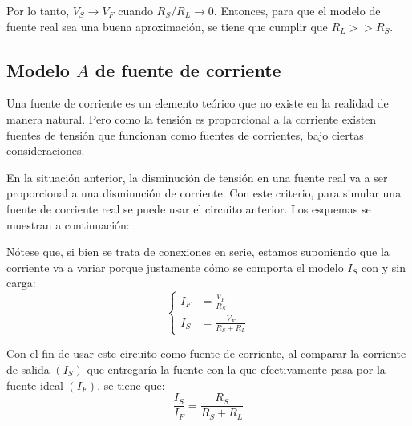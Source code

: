 \documentclass[a5paper,12pt,twoside]{book}
\begin{document}
Por lo tanto, $V_S \to V_F$ cuando $R_S / R_L \to 0$. Entonces, para que el modelo de fuente real sea una buena aproximación, se tiene que cumplir que $R_L >> R_S$.

\begin{center}
    \def\svgwidth{0.6\linewidth}
    
\end{center}


\subsection*{Modelo $A$ de fuente de corriente}

Una fuente de corriente es un elemento teórico que no existe en la realidad de manera natural. Pero como la tensión es proporcional a la corriente existen fuentes de tensión que funcionan como fuentes de corrientes, bajo ciertas consideraciones.

En la situación anterior, la disminución de tensión en una fuente real va a ser proporcional a una disminución de corriente.
Con este criterio, para simular una fuente de corriente real se puede usar el circuito anterior.
Los esquemas se muestran a continuación:

\begin{multicols}{2}
    \begin{center}
        \def\svgwidth{0.9\linewidth}
        
    \end{center}
    \begin{center}
        \def\svgwidth{0.9\linewidth}
        
    \end{center}
\end{multicols}

Nótese que, si bien se trata de conexiones en serie, estamos suponiendo que la corriente va a variar porque justamente cómo se comporta el modelo $I_S$ con y sin carga:
\begin{equation*}
    \left\{
    \begin{aligned}
        I_F &= \frac{V_F}{R_S}
        \\[1ex]
        I_S &= \frac{V_F}{R_S + R_L}
    \end{aligned}
    \right.
\end{equation*}

Con el fin de usar este circuito como fuente de corriente, al comparar la corriente de salida $(I_S)$ que entregaría la fuente con la que efectivamente pasa por la fuente ideal $(I_F)$, se tiene que:
\begin{equation*}
    \frac{I_S}{I_F} = \frac{R_S}{R_S + R_L}
\end{equation*}
\end{document}
